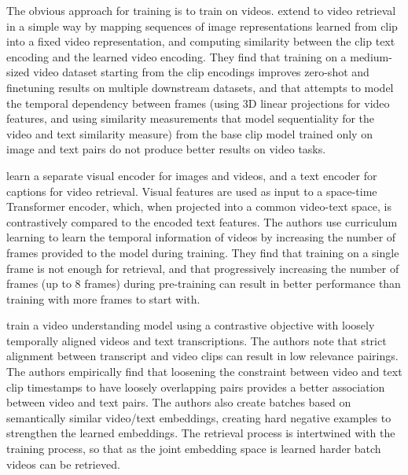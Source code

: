 The obvious approach for training  is to train on videos.
\citet{luo2022clip4clip} extend  to video retrieval in a simple
way by mapping sequences of image representations learned from \acrshort{clip}
into a fixed video representation, and computing similarity between the
\acrshort{clip} text encoding and the learned video encoding. They find that
training on a medium-sized video dataset starting from the \acrshort{clip}
encodings improves zero-shot and finetuning results on multiple downstream
datasets, and that attempts to model the temporal dependency between frames
(using 3D linear projections for video features, and using similarity
measurements that model sequentiality for the video and text similarity
measure) from the base \acrshort{clip} model trained only on image and text
pairs do not produce better results on video tasks.

\citet{bain2021frozen} learn a separate visual encoder for images and videos,
and a text encoder for captions for video retrieval. Visual features are used
as input to a space-time Transformer encoder, which, when projected into a
common video-text space, is contrastively compared to the encoded text
features. The authors use curriculum learning to learn the temporal information
of videos by increasing the number of frames provided to the model during
training. They find that training on a single frame is not enough for
retrieval, and that progressively increasing the number of frames (up to 8
frames) during pre-training can result in better performance than training with
more frames to start with. 

\cite{xu2021videoclip} train a video understanding model using a contrastive
objective with loosely temporally aligned videos and text transcriptions. The
authors note that strict alignment between transcript and video clips can
result in low relevance pairings. 
The authors
empirically find that loosening the constraint between video and text clip
timestamps to have loosely overlapping pairs provides a better association
between video and text pairs. The authors also create batches based on
semantically similar video/text embeddings, creating hard negative examples
to strengthen the learned embeddings. The retrieval process is intertwined
with the training process, so that as the joint embedding space is learned
harder batch videos can be retrieved.


